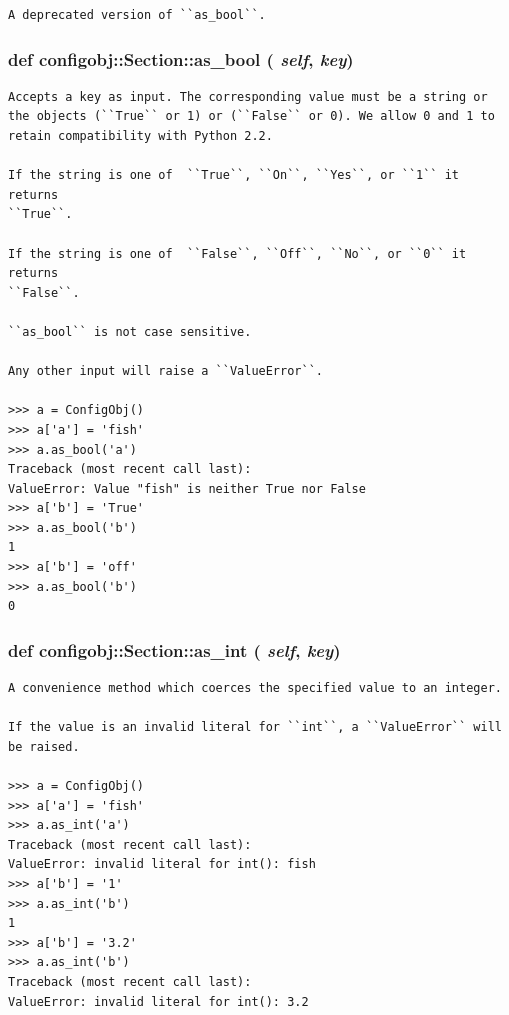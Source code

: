 \footnotesize\begin{verbatim}A deprecated version of ``as_bool``.\end{verbatim}
\normalsize
\subsubsection{\setlength{\rightskip}{0pt plus 5cm}def configobj::Section::as\_\-bool ( {\em self},  {\em key})}\label{classconfigobj_1_1Section_8dc2258e3f064401b42543b683e9ba36}




\footnotesize\begin{verbatim}
Accepts a key as input. The corresponding value must be a string or
the objects (``True`` or 1) or (``False`` or 0). We allow 0 and 1 to
retain compatibility with Python 2.2.

If the string is one of  ``True``, ``On``, ``Yes``, or ``1`` it returns 
``True``.

If the string is one of  ``False``, ``Off``, ``No``, or ``0`` it returns 
``False``.

``as_bool`` is not case sensitive.

Any other input will raise a ``ValueError``.

>>> a = ConfigObj()
>>> a['a'] = 'fish'
>>> a.as_bool('a')
Traceback (most recent call last):
ValueError: Value "fish" is neither True nor False
>>> a['b'] = 'True'
>>> a.as_bool('b')
1
>>> a['b'] = 'off'
>>> a.as_bool('b')
0
\end{verbatim}
\normalsize
\subsubsection{\setlength{\rightskip}{0pt plus 5cm}def configobj::Section::as\_\-int ( {\em self},  {\em key})}\label{classconfigobj_1_1Section_4b13bb3a9ecb2478305424696b3f06e1}




\footnotesize\begin{verbatim}
A convenience method which coerces the specified value to an integer.

If the value is an invalid literal for ``int``, a ``ValueError`` will
be raised.

>>> a = ConfigObj()
>>> a['a'] = 'fish'
>>> a.as_int('a')
Traceback (most recent call last):
ValueError: invalid literal for int(): fish
>>> a['b'] = '1'
>>> a.as_int('b')
1
>>> a['b'] = '3.2'
>>> a.as_int('b')
Traceback (most recent call last):
ValueError: invalid literal for int(): 3.2
\end{verbatim}
\normalsize
